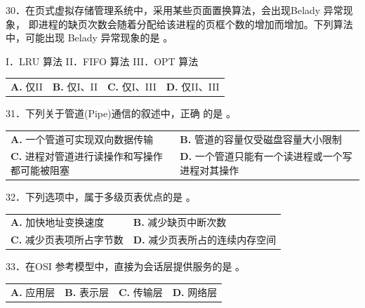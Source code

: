 \documentclass[UTF8,11pt]{ctexart}
\begin{document}
30．在页式虚拟存储管理系统中，采用某些页面置换算法，会出现Belady 异常现象， 即进程的缺页次数会随着分配给该进程的页框个数的增加而增加。下列算法中，可能出现 Belady 异常现象的是 。


I．LRU 算法 II．FIFO 算法 III．OPT 算法


\begin{center}\begin{tabular}{>{\raggedright\arraybackslash}p{\dimexpr(\linewidth-8\tabcolsep)/4\relax}>{\raggedright\arraybackslash}p{\dimexpr(\linewidth-8\tabcolsep)/4\relax}>{\raggedright\arraybackslash}p{\dimexpr(\linewidth-8\tabcolsep)/4\relax}>{\raggedright\arraybackslash}p{\dimexpr(\linewidth-8\tabcolsep)/4\relax}}
\textbf{A.} 仅II & \textbf{B.} 仅I、II & \textbf{C.} 仅I、III & \textbf{D.} 仅II、III\\[.35em]\end{tabular}\end{center}

31．下列关于管道(Pipe)通信的叙述中，正确 的是 。


\begin{center}\begin{tabular}{>{\raggedright\arraybackslash}p{\dimexpr(\linewidth-4\tabcolsep)/2\relax}>{\raggedright\arraybackslash}p{\dimexpr(\linewidth-4\tabcolsep)/2\relax}}
\textbf{A.} 一个管道可实现双向数据传输 & \textbf{B.} 管道的容量仅受磁盘容量大小限制\\[.35em]
\textbf{C.} 进程对管道进行读操作和写操作都可能被阻塞 & \textbf{D.} 一个管道只能有一个读进程或一个写进程对其操作\\[.35em]\end{tabular}\end{center}

32．下列选项中，属于多级页表优点的是 。


\begin{center}\begin{tabular}{>{\raggedright\arraybackslash}p{\dimexpr(\linewidth-4\tabcolsep)/2\relax}>{\raggedright\arraybackslash}p{\dimexpr(\linewidth-4\tabcolsep)/2\relax}}
\textbf{A.} 加快地址变换速度 & \textbf{B.} 减少缺页中断次数\\[.35em]
\textbf{C.} 减少页表项所占字节数 & \textbf{D.} 减少页表所占的连续内存空间\\[.35em]\end{tabular}\end{center}

33．在OSI 参考模型中，直接为会话层提供服务的是 。


\begin{center}\begin{tabular}{>{\raggedright\arraybackslash}p{\dimexpr(\linewidth-8\tabcolsep)/4\relax}>{\raggedright\arraybackslash}p{\dimexpr(\linewidth-8\tabcolsep)/4\relax}>{\raggedright\arraybackslash}p{\dimexpr(\linewidth-8\tabcolsep)/4\relax}>{\raggedright\arraybackslash}p{\dimexpr(\linewidth-8\tabcolsep)/4\relax}}
\textbf{A.} 应用层 & \textbf{B.} 表示层 & \textbf{C.} 传输层 & \textbf{D.} 网络层\\[.35em]\end{tabular}\end{center}
\end{document}

